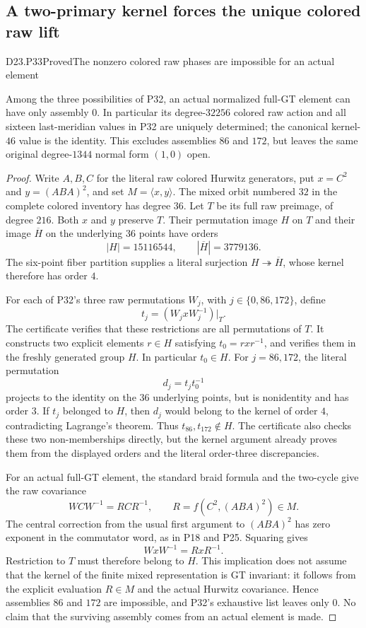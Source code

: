 \subsection{A two-primary kernel forces the unique colored raw lift}

\begin{statement}{D23.P33}{Proved}{The nonzero colored raw phases are impossible for an actual element}
\end{statement}
Among the three possibilities of P32, an actual normalized
full-GT element can have only assembly $0$. In particular
its degree-$32256$ colored raw action and all sixteen
last-meridian values in P32 are uniquely determined; the
canonical kernel-$46$ value is the identity.
This excludes assemblies $86$ and $172$, but leaves the
same original degree-$1344$ normal form $(1,0)$ open.

\begin{proof}
Write $A,B,C$ for the literal raw colored Hurwitz generators,
put $x=C^2$ and $y=(ABA)^2$, and set $M=\langle x,y\rangle$.
The mixed orbit numbered $32$ in the complete colored
inventory has degree $36$. Let $T$ be its full raw preimage,
of degree $216$. Both $x$ and $y$ preserve $T$.
Their permutation image $H$ on $T$ and their image
$\overline H$ on the underlying $36$ points have orders
\[
 |H|=15116544,\qquad |\overline H|=3779136.
\]
The six-point fiber partition supplies a literal surjection
$H\twoheadrightarrow\overline H$, whose kernel therefore
has order $4$.

For each of P32's three raw permutations $W_j$, with
$j\in\{0,86,172\}$, define
\[
                 t_j=(W_jxW_j^{-1})|_T.
\]
The certificate verifies that these restrictions are all
permutations of $T$. It constructs two explicit elements
$r\in H$ satisfying $t_0=rxr^{-1}$, and verifies them
in the freshly generated group $H$. In particular $t_0\in H$.
For $j=86,172$, the literal permutation
\[
                         d_j=t_jt_0^{-1}
\]
projects to the identity on the $36$ underlying points,
but is nonidentity and has order $3$.
If $t_j$ belonged to $H$, then $d_j$ would belong to the
kernel of order $4$, contradicting Lagrange's theorem.
Thus $t_{86},t_{172}\notin H$. The certificate also checks
these two non-memberships directly, but the kernel argument
already proves them from the displayed orders and the
literal order-three discrepancies.

For an actual full-GT element, the standard braid formula
and the two-cycle give the raw covariance
\[
 W C W^{-1}=RCR^{-1},\qquad R=f(C^2,(ABA)^2)\in M.
\]
The central correction from the usual first argument to
$(ABA)^2$ has zero exponent in the commutator word, as in
P18 and P25. Squaring gives
\[
                         WxW^{-1}=RxR^{-1}.
\]
Restriction to $T$ must therefore belong to $H$.
This implication does not assume that the kernel of the
finite mixed representation is GT invariant: it follows
from the explicit evaluation $R\in M$ and the actual
Hurwitz covariance. Hence assemblies $86$ and $172$
are impossible, and P32's exhaustive list leaves only $0$.
No claim that the surviving assembly comes from an actual
element is made.
\end{proof}

